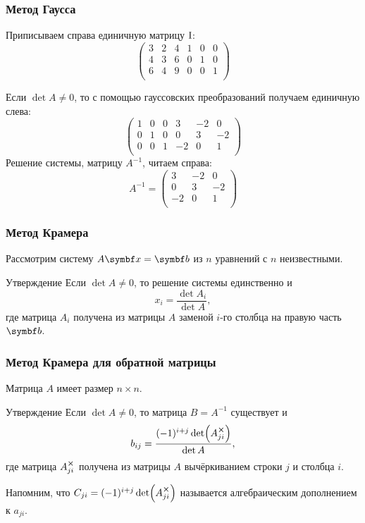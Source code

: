 \begin{frame}
\frametitle{Метод Гаусса}

Приписываем справа единичную матрицу $\mathrm{I}$:
\[
\left(
\begin{array}{ccc|ccc}
3 & 2 & 4  & 1 & 0 & 0 \\
4 & 3 & 6 & 0 & 1 & 0 \\
6 & 4 & 9  & 0 & 0 & 1\\
\end{array}
\right)
\]

Если $\det A\neq 0$, то с помощью гауссовских преобразований получаем единичную слева:
\[
\left(
\begin{array}{ccc|ccc}
1 & 0 & 0  & 3 & -2 & 0 \\
0 & 1 & 0 & 0 & 3 & -2 \\
0 & 0 & 1  & -2 & 0 & 1\\
\end{array}
\right)
\]
\pause
Решение системы, матрицу $A^{-1}$, читаем справа:
\[
A^{-1} =   \begin{pmatrix}
 3 & -2 & 0 \\
 0 & 3 & -2 \\
 -2 & 0 & 1\\
\end{pmatrix} 
\]

\end{frame}



\begin{frame}
    \frametitle{Метод Крамера}

    Рассмотрим систему $A\bx = \bb$ из $n$ уравнений с $n$ неизвестными.

    \pause

    \begin{block}{Утверждение}
        Если $\det A \neq 0$, то решение системы единственно и 
        \[
        x_i = \frac{\det A_i}{\det A},    
        \]
        где матрица $A_i$ получена из матрицы $A$ заменой $i$-го столбца на правую часть $\bb$.
    \end{block}


\end{frame}


\begin{frame}
    \frametitle{Метод Крамера для обратной матрицы}

    Матрица $A$ имеет размер $n\times n$.

    \pause

    \begin{block}{Утверждение}
        Если $\det A \neq 0$, то матрица $B=A^{-1}$ существует и
        \[
        b_{ij} = \frac{(-1)^{i+j}\det (A_{ji}^{\cross})}{\det A},    
        \]
        где матрица $A_{ji}^{\cross}$ получена из матрицы $A$ вычёркиванием строки $j$ и столбца $i$.
    \end{block}
    \pause

    Напомним, что $C_{ji}=(-1)^{i+j}\det (A_{ji}^{\cross})$ называется \alert{алгебраическим дополнением} к $a_{ji}$.

\end{frame}


